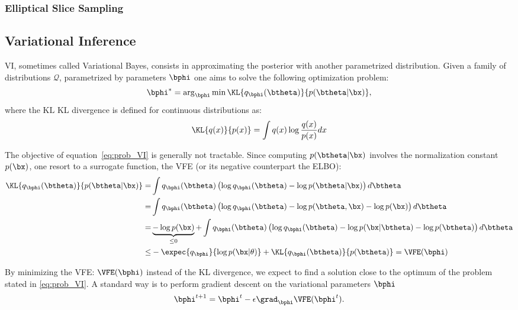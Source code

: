 \subsubsection{Elliptical Slice Sampling}



\subsection{Variational Inference}

\acf{VI}, sometimes called Variational Bayes, consists in approximating the posterior with another parametrized distribution.
Given a family of distributions $\mathcal{Q}$, parametrized by parameters $\bphi$ one aims to solve the following optimization problem:
\begin{align}
\bphi^* = \arg_{\bphi}\min \KL{q_{\bphi}(\btheta)}{p(\btheta|\bx)},
\label{eq:prob_VI}
\end{align}
where the $\mathrm{KL}$ \ac{KL} divergence is defined for continuous distributions as:
\begin{align}
\KL{q(x)}{p(x)} = \int q(x) \log \frac{q(x)}{p(x)}dx
\end{align}

The objective of equation~\eqref{eq:prob_VI} is generally not tractable.
Since computing $p(\btheta|\bx)$ involves the normalization constant $p(\bx)$, one resort to a surrogate function, the \ac{VFE} (or its negative counterpart the \ac{ELBO}):
\begin{align}
\KL{q_{\bphi}(\btheta)}{p(\btheta|\bx)} =& \int q_{\bphi}(\btheta) \left(\log q_{\bphi}(\btheta) - \log p(\btheta|\bx)\right)d\btheta\\
=&\int q_{\bphi}(\btheta) \left(\log q_{\bphi}(\btheta) - \log p(\btheta, \bx) - \log p(\bx)\right)d\btheta\\
=&\underbrace{- \log p(\bx)}_{\leq 0} + \int q_{\bphi}(\btheta) \left(\log q_{\bphi}(\btheta) - \log p(\bx|\btheta)- \log p(\btheta) \right)d\btheta\\
\leq& -\expec{q_{\bphi}}{\log p(\bx|\theta)} + \KL{q_{\bphi}(\btheta)}{p(\btheta)} = \VFE(\bphi)
\end{align}


By minimizing the \ac{VFE}: $\VFE(\bphi)$ instead of the \ac{KL} divergence, we expect to find a solution close to the optimum of the problem stated in \eqref{eq:prob_VI}.
A standard way is to perform gradient descent on the variational parameters $\bphi$
\begin{align}
\bphi^{t+1} = \bphi^{t} - \epsilon \grad_{\bphi}\VFE(\bphi^{t}).
\label{eq:vigraddescent}
\end{align}

